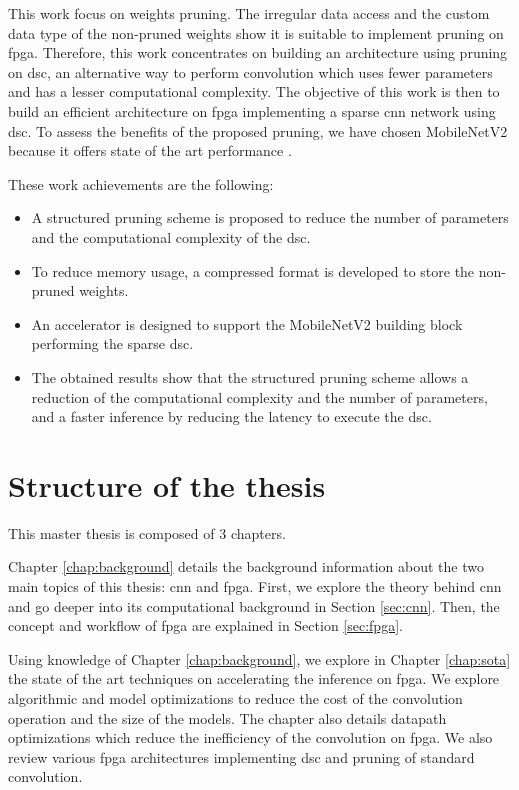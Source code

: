 This work focus on weights pruning. The irregular data access and the custom data type of the non-pruned weights show it is suitable to implement pruning on \acrshort{fpga}. Therefore, this work concentrates on building an architecture using pruning on \acrfull{dsc}, an alternative way to perform convolution which uses fewer parameters and has a lesser computational complexity. The objective of this work is then to build an efficient architecture on \acrshort{fpga} implementing a sparse \acrshort{cnn} network using \acrshort{dsc}. To assess the benefits of the proposed pruning, we have chosen MobileNetV2 because it offers state of the art performance \cite{sandler_mobilenetv2_2018}.

These work achievements are the following:
%
\begin{itemize}
    \item A structured pruning scheme is proposed to reduce the number of parameters and the computational complexity of the \acrshort{dsc}.
    \item To reduce memory usage, a compressed format is developed to store the non-pruned weights.
    \item An accelerator is designed to support the MobileNetV2 building block performing the sparse \acrshort{dsc}.
    \item The obtained results show that the structured pruning scheme allows a reduction of the computational complexity and the number of parameters, and a faster inference by reducing the latency to execute the \acrshort{dsc}.
\end{itemize}
%
%
\section*{Structure of the thesis}
%
%
This master thesis is composed of 3 chapters.

Chapter \ref{chap:background} details the background information about the two main topics of this thesis: \acrshort{cnn} and \acrshort{fpga}. First, we explore the theory behind \acrshort{cnn} and go deeper into its computational background in Section \ref{sec:cnn}. Then, the concept and workflow of \acrshort{fpga} are explained in Section \ref{sec:fpga}.

Using knowledge of Chapter \ref{chap:background}, we explore in Chapter \ref{chap:sota} the state of the art techniques on accelerating the inference on \acrshort{fpga}. We explore algorithmic and model optimizations to reduce the cost of the convolution operation and the size of the models. The chapter also details datapath optimizations which reduce the inefficiency of the convolution on \acrshort{fpga}. We also review various \acrshort{fpga} architectures implementing \acrshort{dsc} and pruning of standard convolution.

